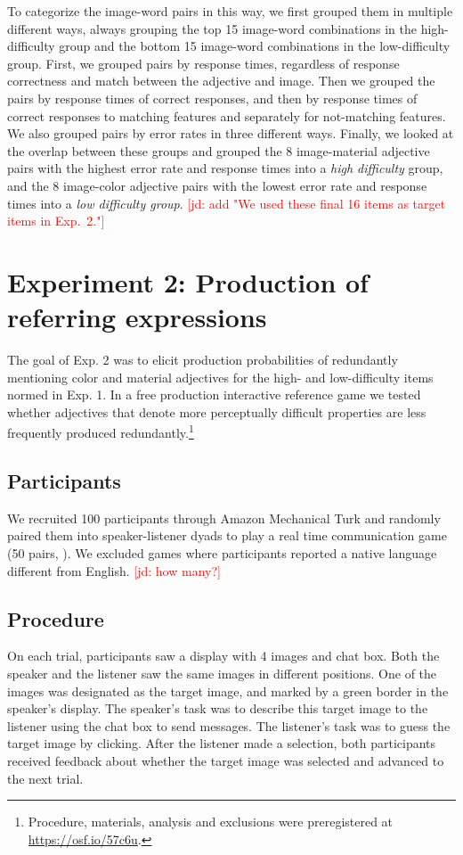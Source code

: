 \documentclass[12pt,letterpaper]{article}
\newcommand{\jd}[1]{\textcolor{Red}{[jd: #1]}}
\begin{document}
To categorize the image-word pairs in this way, we first grouped them in multiple different ways, always grouping the top 15 image-word combinations in the high-difficulty group and the bottom 15 image-word combinations in the low-difficulty group. First, we grouped pairs by response times, regardless of response correctness and match between the adjective and image. Then we grouped the pairs by response times of correct responses, and then by response times of correct responses to matching features and separately for not-matching features. We also grouped pairs by error rates in three different ways. Finally, we looked at the overlap between these groups and grouped the 8 image-material adjective pairs with the highest error rate and response times into a \textit{high difficulty} group, and the 8 image-color adjective pairs with the lowest error rate and response times into a \textit{low difficulty group}. \jd{add "We used these final 16 items as target items in Exp.~2."}

\section{Experiment 2: Production of referring expressions} 

The goal of Exp. 2 was to elicit production probabilities of redundantly mentioning color and material adjectives for the high- and low-difficulty items normed in Exp. 1. In a free production interactive reference game we tested whether adjectives that denote more perceptually difficult properties are less frequently produced redundantly.\footnote{Procedure, materials, analysis and exclusions were preregistered at \href {https://osf.io/57c6u}{https://osf.io/57c6u}.}

\subsection{Participants} 

We recruited 100 participants through Amazon Mechanical Turk and randomly paired them into speaker-listener dyads to play a real time communication game (50 pairs, \citealt{Hawkins2015}). We excluded games where participants reported a native language different from English. \jd{how many?}

\subsection{Procedure} 

On each trial, participants saw a display with 4 images and chat box. Both the speaker and the listener saw the same images in different positions. One of the images was designated as the target image, and marked by a green border in the speaker's display. The speaker's task was to describe this target image to the listener using the chat box to send messages. The listener's task was to guess the target image by clicking. After the listener made a selection, both participants received feedback about whether the target image was selected and advanced to the next trial. 
\end{document}
